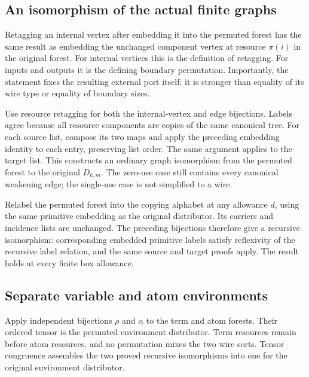 \subsection{An isomorphism of the actual finite graphs}
Retagging an internal vertex after embedding it into the permuted forest
has the same result as embedding the unchanged component vertex at resource
$\pi(i)$ in the original forest. For internal vertices this is the definition
of retagging. For inputs and outputs it is the defining boundary permutation.
Importantly, the statement fixes the resulting external port itself; it is
stronger than equality of its wire type or equality of boundary sizes.

Use resource retagging for both the internal-vertex and edge bijections.
Labels agree because all resource components are copies of the same canonical
tree. For each source list, compose its two maps and apply the preceding
embedding identity to each entry, preserving list order. The same argument
applies to the target list. This constructs an ordinary graph isomorphism
from the permuted forest to the original $D_{k,m}$.
The zero-use case still contains every canonical weakening edge; the
single-use case is not simplified to a wire.

Relabel the permuted forest into the copying alphabet at any allowance $d$,
using the same primitive embedding as the original distributor. Its carriers
and incidence lists are unchanged. The preceding bijections therefore give
a recursive isomorphism: corresponding embedded primitive labels satisfy
reflexivity of the recursive label relation, and the same source and target
proofs apply. The result holds at every finite box allowance.

\subsection{Separate variable and atom environments}
Apply independent bijections $\rho$ and $\alpha$ to the term and atom forests.
Their ordered tensor is the permuted environment distributor. Term resources
remain before atom resources, and no permutation mixes the two wire sorts.
Tensor congruence assembles the two proved recursive isomorphisms into one
for the original environment distributor.

